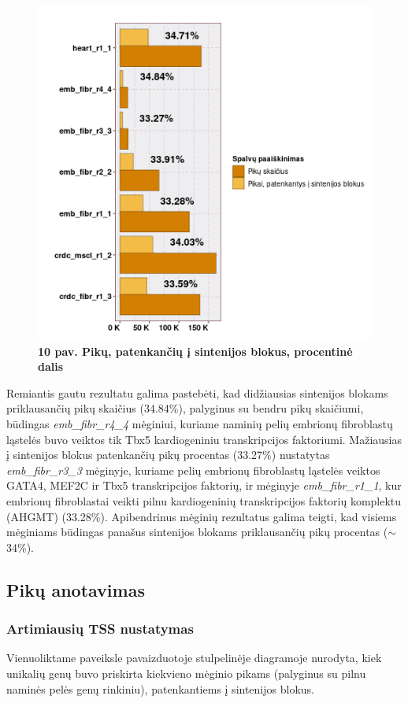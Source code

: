 \documentclass[12pt]{article}
\begin{document}
\begin{figure}[htb]
    \begin{center}
        \includegraphics[width=0.65\linewidth]{../Figures/Synteny_blocks_peaks.png}
        \vspace{-2\baselineskip}
        \caption*{\small\textbf{10 pav. Pikų, patenkančių į sintenijos blokus,
                                procentinė dalis}}
        \label{fig:10}
    \end{center}
\end{figure}

Remiantis gautu rezultatu galima pastebėti, kad didžiausias sintenijos blokams
priklausančių pikų skaičius (34.84\%), palyginus su bendru pikų skaičiumi,
būdingas \emph{emb\_fibr\_r4\_4} mėginiui, kuriame naminių pelių embrionų
fibroblastų ląstelės buvo veiktos tik Tbx5 kardiogeniniu transkripcijos
faktoriumi. Mažiausias į sintenijos blokus patenkančių pikų procentas (33.27\%)
nus\-ta\-ty\-tas \emph{emb\_fibr\_r3\_3} mėginyje, kuriame pelių embrionų
fibroblastų ląstelės veiktos GATA4, MEF2C ir Tbx5 transkripcijos faktorių, ir
mėginyje \emph{emb\_fibr\_r1\_1}, kur embrionų fibroblastai veikti pilnu
kardiogeninių trans\-krip\-ci\-jos faktorių komplektu (AHGMT) (33.28\%).
Apibendrinus mėginių rezultatus galima teigti, kad visiems mėginiams būdingas
panašus sintenijos blokams priklausančių pikų procentas ($\sim$34\%).

\subsection{Pikų anotavimas}
\subsubsection{Artimiausių TSS nustatymas}
Vienuoliktame paveiksle pavaizduotoje stulpelinėje diagramoje nurodyta, kiek
unikalių genų buvo priskirta kiekvieno mėginio pikams (palyginus su pilnu
naminės pelės genų rinkiniu), patenkantiems į sintenijos blokus.
\end{document}
